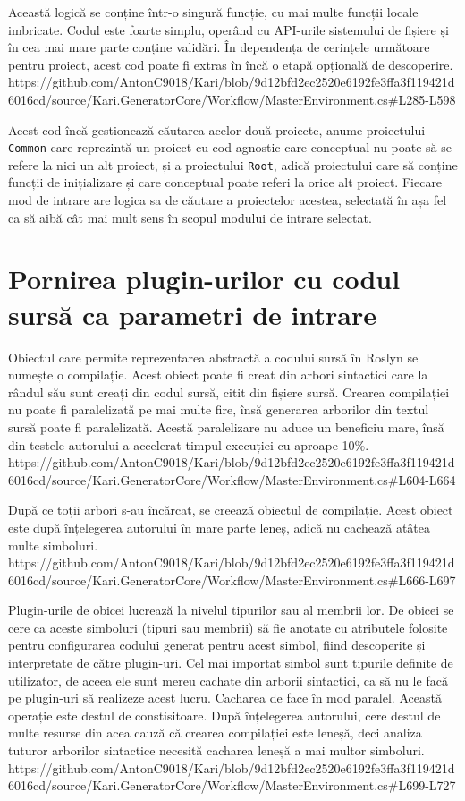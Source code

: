 \documentclass[a4paper,12pt]{report}
\begin{document}
Această logică se conține într-o singură funcție, cu mai multe funcții locale imbricate.
Codul este foarte simplu, operând cu \ac{API}-urile sistemului de fișiere și în cea mai mare parte conține validări.
În dependența de cerințele următoare pentru proiect, acest cod poate fi extras în încă o etapă opțională de descoperire.
https://github.com/AntonC9018/Kari/blob/9d12bfd2ec2520e6192fe3ffa3f119421d6016cd/source/Kari.GeneratorCore/Workflow/MasterEnvironment.cs#L285-L598

Acest cod încă gestionează căutarea acelor două proiecte, anume proiectului \texttt{Common} care reprezintă un proiect cu cod agnostic care conceptual nu poate să se refere la nici un alt proiect, și a proiectului \texttt{Root}, adică proiectului care să conține funcții de inițializare și care conceptual poate referi la orice alt proiect.
Fiecare mod de intrare are logica sa de căutare a proiectelor acestea, selectată în așa fel ca să aibă cât mai mult sens în scopul modului de intrare selectat.

\section{Pornirea plugin-urilor cu codul sursă ca parametri de intrare}

Obiectul care permite reprezentarea abstractă a codului sursă în Roslyn se numește o compilație.
Acest obiect poate fi creat din arbori sintactici care la rândul său sunt creați din codul sursă, citit din fișiere sursă.
Crearea compilației nu poate fi paralelizată pe mai multe fire, însă generarea arborilor din textul sursă poate fi paralelizată.
Acestă paralelizare nu aduce un beneficiu mare, însă din testele autorului a accelerat timpul execuției cu aproape 10\%.
https://github.com/AntonC9018/Kari/blob/9d12bfd2ec2520e6192fe3ffa3f119421d6016cd/source/Kari.GeneratorCore/Workflow/MasterEnvironment.cs#L604-L664

După ce toții arbori s-au încărcat, se creează obiectul de compilație.
Acest obiect este după înțelegerea autorului în mare parte leneș, adică nu cachează atâtea multe simboluri.
https://github.com/AntonC9018/Kari/blob/9d12bfd2ec2520e6192fe3ffa3f119421d6016cd/source/Kari.GeneratorCore/Workflow/MasterEnvironment.cs#L666-L697

Plugin-urile de obicei lucrează la nivelul tipurilor sau al membrii lor.
De obicei se cere ca aceste simboluri (tipuri sau membrii) să fie anotate cu atributele folosite pentru configurarea codului generat pentru acest simbol, fiind descoperite și interpretate de către plugin-uri.
Cel mai importat simbol sunt tipurile definite de utilizator, de aceea ele sunt mereu cachate din arborii sintactici, ca să nu le facă pe plugin-uri să realizeze acest lucru.
Cacharea de face în mod paralel.
Această operație este destul de constisitoare.
După înțelegerea autorului, cere destul de multe resurse din acea cauză că crearea compilației este leneșă, deci analiza tuturor arborilor sintactice necesită cacharea leneșă a mai multor simboluri.
https://github.com/AntonC9018/Kari/blob/9d12bfd2ec2520e6192fe3ffa3f119421d6016cd/source/Kari.GeneratorCore/Workflow/MasterEnvironment.cs#L699-L727
\end{document}
